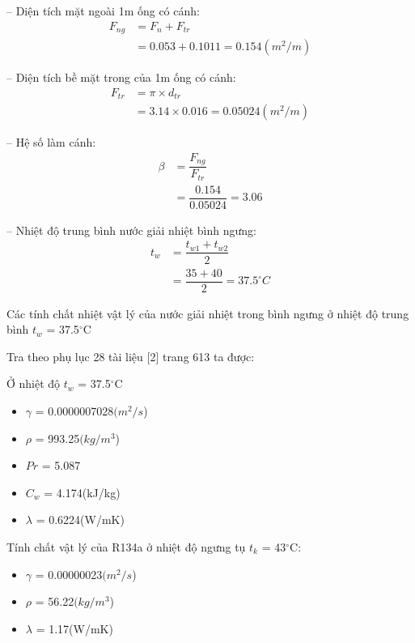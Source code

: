 -- Diện tích mặt ngoài 1m ống có cánh:
\begin{equation*}
	\begin{split}
		F_{ng} &= F_{n} + F_{tr}\\
		&= 0.053 + 0.1011 = 0.154(m^2/m)
	\end{split}
\end{equation*}

-- Diện tích bề mặt trong của 1m ống có cánh:
\begin{equation*}
	\begin{split}
		F_{tr} &= \pi\times d_{tr}\\
		&= 3.14 \times 0.016 = 0.05024(m^2/m)
	\end{split}
\end{equation*}	

-- Hệ số làm cánh:
\begin{equation*}
	\begin{split}
		\beta &= \dfrac{F_{ng}}{F_{tr}}\\
		&= \dfrac{0.154}{0.05024}= 3.06
	\end{split}
\end{equation*}	

-- Nhiệt độ trung bình nước giải nhiệt bình ngưng:
\begin{equation*}
	\begin{split}
		t_{w} &= \dfrac{t_{w1} + t_{w2}}{2}\\
		&= \dfrac{35 + 40}{2} = 37.5^{\circ}C
	\end{split}
\end{equation*}	

Các tính chất nhiệt vật lý của nước giải nhiệt trong bình ngưng ở nhiệt độ trung bình $t_{w}$ = 37.5$^{\circ}$C

Tra theo phụ lục 28 tài liệu [2] trang 613 ta được:

Ở nhiệt độ $ t_{w} $ = 37.5$^{\circ}$C
\begin{itemize}
	\item $\gamma$ = 0.0000007028$(m^2/s$)
	\item $\rho$ =  993.25$(kg/m^3$)
	\item $Pr$ =  	5.087
	\item $C_{w}$ =  4.174(kJ/kg)	
	\item $\lambda$ = 0.6224(W/mK)
\end{itemize}


Tính chất vật lý của R134a ở nhiệt độ ngưng tụ $ t_{k} $ = 43$^{\circ}$C:
\begin{itemize}
	\item $\gamma$ = 0.00000023$(m^2/s$)
	\item $\rho$ = 56.22$(kg/m^3$)
	\item $\lambda$ = 1.17(W/mK)
\end{itemize}

